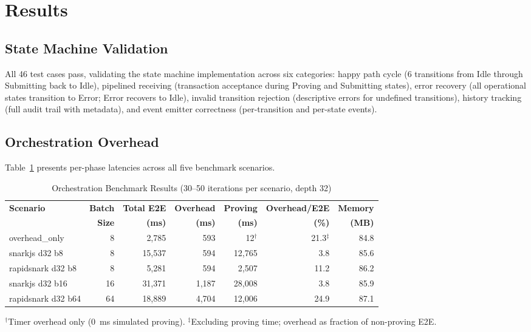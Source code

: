 
\section{Results}

\subsection{State Machine Validation}

All 46 test cases pass, validating the state machine implementation across
six categories: happy path cycle (6 transitions from Idle through Submitting
back to Idle), pipelined receiving (transaction acceptance during Proving
and Submitting states), error recovery (all operational states transition to
Error; Error recovers to Idle), invalid transition rejection (descriptive
errors for undefined transitions), history tracking (full audit trail with
metadata), and event emitter correctness (per-transition and per-state events).

\subsection{Orchestration Overhead}

Table~\ref{tab:overhead} presents per-phase latencies across all five
benchmark scenarios.

\begin{table}[t]
\centering
\caption{Orchestration Benchmark Results (30--50 iterations per scenario, depth 32)}
\label{tab:overhead}
\begin{tabular}{lrrrrrr}
\toprule
\textbf{Scenario} & \textbf{Batch} & \textbf{Total E2E} & \textbf{Overhead} & \textbf{Proving} & \textbf{Overhead/E2E} & \textbf{Memory} \\
                   & \textbf{Size}  & \textbf{(ms)}      & \textbf{(ms)}     & \textbf{(ms)}    & \textbf{(\%)}         & \textbf{(MB)} \\
\midrule
overhead\_only     & 8  & 2,785  & 593  & 12$^\dagger$   & 21.3$^\ddagger$ & 84.8 \\
snarkjs d32 b8     & 8  & 15,537 & 594  & 12,765 & 3.8  & 85.6 \\
rapidsnark d32 b8  & 8  & 5,281  & 594  & 2,507  & 11.2 & 86.2 \\
snarkjs d32 b16    & 16 & 31,371 & 1,187 & 28,008 & 3.8  & 85.9 \\
rapidsnark d32 b64 & 64 & 18,889 & 4,704 & 12,006 & 24.9 & 87.1 \\
\bottomrule
\end{tabular}
\begin{flushleft}
\small $^\dagger$Timer overhead only (0~ms simulated proving). $^\ddagger$Excluding
proving time; overhead as fraction of non-proving E2E.
\end{flushleft}
\end{table}

